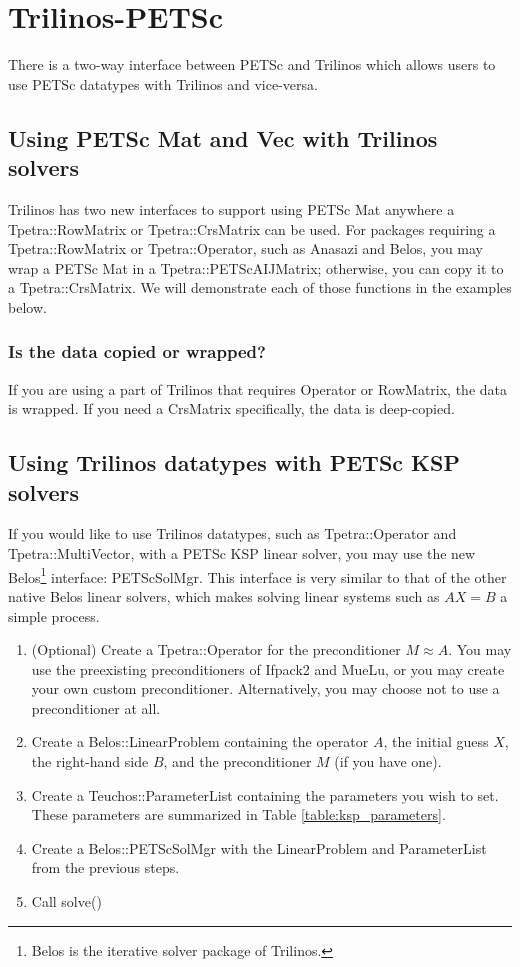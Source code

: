 \section{Trilinos-PETSc}
There is a two-way interface between PETSc and Trilinos which allows users to
use PETSc datatypes with Trilinos and vice-versa.

\subsection{Using PETSc Mat and Vec with Trilinos solvers}
Trilinos has two new interfaces to support using PETSc Mat anywhere
a Tpetra::Row\-Matrix or Tpetra::CrsMatrix can be used.  For packages requiring
a Tpetra::RowMatrix or Tpetra::Operator, such as Anasazi and Belos, you may wrap a
PETSc Mat in a Tpetra::PETSc\-AIJ\-Matrix; otherwise, you can copy it to a
Tpetra::CrsMatrix.  We will demonstrate each of those functions in the examples
below.





\subsubsection{Is the data copied or wrapped?}
If you are using a part of Trilinos that requires Operator or RowMatrix, the
data is wrapped.  If you need a CrsMatrix specifically, the data is deep-copied.

\subsection{Using Trilinos datatypes with PETSc KSP solvers}
If you would like to use Trilinos datatypes, such as Tpetra::Operator and
Tpetra::Multi\-Vector, with a PETSc KSP linear solver, you may use the new
Belos\footnote{Belos is the iterative solver package of Trilinos.} interface:
PETScSolMgr.  This interface is very similar to that of the other native Belos
linear solvers, which makes solving linear systems such as $AX=B$ a simple
process.

\begin{enumerate}
  \item (Optional) Create a Tpetra::Operator for the preconditioner $M \approx
  A$.  You may use the preexisting preconditioners of Ifpack2 and MueLu, or you
  may create your own custom preconditioner.  Alternatively, you may choose not
  to use a preconditioner at all.
  \item Create a Belos::LinearProblem containing the operator $A$, the initial
  guess $X$, the right-hand side $B$, and the preconditioner $M$ (if you have
  one).
  \item Create a Teuchos::ParameterList containing the parameters you wish to
  set.  These parameters are summarized in Table \ref{table:ksp_parameters}.
  \item Create a Belos::PETScSolMgr with the LinearProblem and ParameterList
  from the previous steps.
  \item Call solve()
\end{enumerate}

